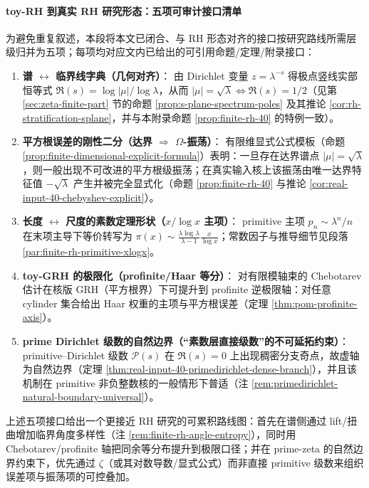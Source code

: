 \paragraph{toy-RH 到真实 RH 研究形态：五项可审计接口清单}\label{par:finite-rh-rhstyle-toolkit}
为避免重复叙述，本段将本文已闭合、与 RH 形态对齐的接口按研究路线所需层级归并为五项；每项均对应文内已给出的可引用命题/定理/附录接口：
\begin{enumerate}
  \item \textbf{谱 \(\leftrightarrow\) 临界线字典（几何对齐）}：
  由 Dirichlet 变量 \(z=\lambda^{-s}\) 得极点竖线实部恒等式 \(\Re(s)=\log|\mu|/\log\lambda\)，从而 \(|\mu|=\sqrt{\lambda}\iff \Re(s)=1/2\)（见第 \ref{sec:zeta-finite-part} 节的命题 \ref{prop:s-plane-spectrum-poles} 及其推论 \ref{cor:rh-stratification-splane}，并与本附录命题 \ref{prop:finite-rh-40} 的特例一致）。
  \item \textbf{平方根误差的刚性二分（达界 \(\Rightarrow\) \(\Omega\)-振荡）}：
  有限维显式公式模板（命题 \ref{prop:finite-dimensional-explicit-formula}）表明：一旦存在达界谱点 \(|\mu|=\sqrt{\lambda}\)，则一般出现不可改进的平方根级振荡；在真实输入核上该振荡由唯一达界特征值 \(-\sqrt{\lambda}\) 产生并被完全显式化（命题 \ref{prop:finite-rh-40} 与推论 \ref{cor:real-input-40-chebyshev-explicit}）。
  \item \textbf{长度 \(\leftrightarrow\) 尺度的素数定理形状（\(x/\log x\) 主项）}：
primitive 主项 \(p_n\sim \lambda^n/n\) 在末项主导下等价转写为 \(\pi(x)\sim \frac{\lambda\log\lambda}{\lambda-1}\frac{x}{\log x}\)；常数因子与推导细节见段落 \ref{par:finite-rh-primitive-xlogx}。
  \item \textbf{toy-GRH 的极限化（profinite/Haar 等分）}：
  对有限模轴束的 Chebotarev 估计在核版 GRH（平方根界）下可提升到 profinite 逆极限轴：对任意 cylinder 集合给出 Haar 权重的主项与平方根误差（定理 \ref{thm:pom-profinite-axis}）。
  \item \textbf{prime Dirichlet 级数的自然边界（“素数层直接级数”的不可延拓约束）}：
  primitive--Dirichlet 级数 \(\mathcal{P}(s)\) 在 \(\Re(s)=0\) 上出现稠密分支奇点，故虚轴为自然边界（定理 \ref{thm:real-input-40-primedirichlet-dense-branch}），并且该机制在 primitive 非负整数核的一般情形下普适（注 \ref{rem:primedirichlet-natural-boundary-universal}）。
\end{enumerate}
上述五项接口给出一个更接近 RH 研究的可累积路线图：首先在谱侧通过 lift/扭曲增加临界角度多样性（注 \ref{rem:finite-rh-angle-entropy}），同时用 Chebotarev/profinite 轴把同余等分布提升到极限口径；并在 prime-zeta 的自然边界约束下，优先通过 \(\zeta\)（或其对数导数/显式公式）而非直接 primitive 级数来组织误差项与振荡项的可控叠加。


